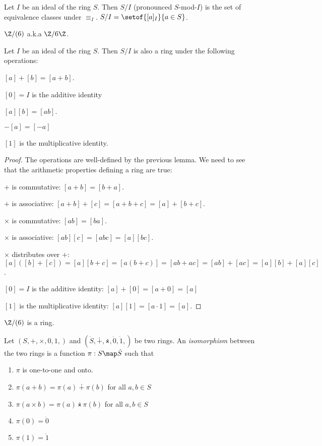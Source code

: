 \documentclass[oneside,12pt]{amsart}
\begin{document}
\begin{definition}
Let $I$ be an ideal of the ring $S$. Then $S/I$ (pronounced $S$-mod-$I$) is the set of equivalence classes under $\equiv_I$.
$S/I=\setof{[a]_I}{a\in S}$.
\end{definition}

\begin{example}
$\Z/(6)$ a.k.a $\Z/6\Z$.
\end{example}

\begin{theorem}
\label{RingModIdealIsRing}
Let $I$ be an ideal of the ring $S$. Then $S/I$ is also a ring under the following operations:
\item $[a]+[b] = [a+b]$.
\item $[0]=I$ is the additive identity
\item $[a][b] = [ab]$.
\item $-[a] = [-a]$
\item $[1]$ is the multiplicative identity.
\end{theorem}
\begin{proof}
The operations are well-defined by the previous lemma. We need to see that the arithmetic properties defining a ring are true:

$+$ is commutative: $[a+b]=[b+a]$.

$+$ is associative: $[a+b] + [c] = [a+b+c] = [a] + [b+c]$.

$\times$ is commutative: $[ab] = [ba]$.

$\times$ is associative: $[ab][c] = [abc] = [a][bc]$.

$\times$ distributes over $+$: $[a]\left([b] + [c] \right) =[a][b+c] = [a(b+c)] = [ab+ac] = [ab] + [ac] =[a][b] + [a][c]$.

$[0]=I$ is the additive identity: $[a] + [0] = [a+0] = [a]$

$[1]$ is the multiplicative identity: $[a][1]=[a\cdot 1] = [a]$.
\end{proof}

\begin{example}
$\Z/(6)$ is a ring.
\end{example}


\begin{definition}
Let $\left(S,+,\times,0,1,\right)$ and $\left(\dot{S},\dotplus,\dottimes,\dot{0},\dot{1},\right)$ be two rings.
An \emph{isomorphism} between the two rings is a function $\pi:S\map\dot{S}$ such that
\begin{enumerate}
\item $\pi$ is one-to-one and onto.
\item $\pi(a+b) = \pi(a) \dotplus \pi(b)$ for all $a,b\in S$
\item $\pi(a\times b) = \pi(a) \dottimes \pi(b)$ for all $a,b\in S$
\item $\pi(0) = \dot{0}$
\item $\pi(1) = \dot{1}$
\end{enumerate}
\end{definition}
\end{document}
